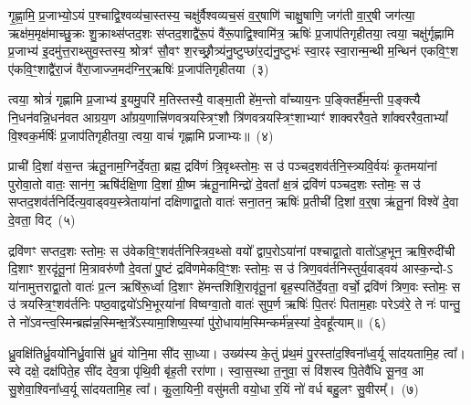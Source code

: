 गृ॒ह्णा॒मि॒ प्र॒जाभ्यो॒\-ऽयं प॒श्चाद्वि॒श्वव्य॑चा॒स्तस्य॒ चक्षु॑र्वैश्वव्यच॒सं व॒र्॒\mbox{}षाणि॑ चाक्षु॒षाणि॒ जग॑ती वा॒र्॒\mbox{}षी जग॑त्या॒ ऋक्ष॑म॒मृक्ष॑माच्छु॒क्रः शु॒क्राथ्स॑प्तद॒शः स॑प्तद॒शाद्वै॑रू॒पं वै॑रू॒पाद्वि॒श्वामि॑त्र॒ ऋषिः॑ प्र॒जा\-प॑तिगृहीतया॒ त्वया॒ चक्षु॑र्गृह्णामि प्र॒जाभ्य॑ इ॒दमु॑त्त॒राथ्सुव॒स्तस्य॒ श्रोत्रꣳ॑ सौ॒वꣳ श॒रच्छ्रौ॒त्र्य॑नु॒ष्टुप्छा॑र॒द्य॑नु॒ष्टुभः॑ स्वा॒रꣴ स्वा॒रान्म॒न्थी म॒न्थिन॑ एकवि॒ꣳ॒श ए॑कवि॒ꣳ॒शाद्वै॑रा॒जं वै॑रा॒जाज्ज॒मद॑ग्नि॒र्॒\mbox{}ऋषिः॑ प्र॒जा\-प॑तिगृहीतया~(३)

त्वया॒ श्रोत्रं॑ गृह्णामि प्र॒जाभ्य॑ इ॒यमु॒परि॑ म॒तिस्तस्यै॒ वाङ्मा॒ती हे॑म॒न्तो वा᳚च्याय॒नः प॒ङ्क्तिर्\mbox{}है॑म॒न्ती प॒ङ्क्त्यै नि॒धन॑वन्नि॒धन॑वत आग्रय॒ण आ᳚ग्रय॒णात्त्रि॑णवत्रयस्त्रिꣳ॒शौ त्रि॑णवत्रयस्त्रिꣳ॒शाभ्याꣳ॑ शाक्वररैव॒ते शा᳚क्वररैव॒ता\-भ्यां᳚ वि॒श्वक॒र्मर्\mbox{}षिः॑ प्र॒जा\-प॑तिगृहीतया॒ त्वया॒ वाचं॑ गृह्णामि प्रजाभ्यः॥~(४)

{\anuvakamend[{त्वया॒ मनो॑ ज॒मद॑ग्नि॒र्॒\mbox{}ऋषिः॑ प्र॒जा\-प॑तिगृहीतया त्रि॒ꣳ॒शच्च॑}]}%

प्राची॑ दि॒शां व॑स॒न्त ऋ॑तू॒नाम॒ग्निर्दे॒वता॒ ब्रह्म॒ द्रवि॑णं त्रि॒वृथ्स्तोमः॒ स उ॑ पञ्चद॒शव॑र्तनि॒स्त्र्यवि॒र्वयः॑ कृ॒तमया॑नां पुरोवा॒तो वातः॒ सान॑ग॒ ऋषि॑र्दक्षि॒णा दि॒शां ग्री॒ष्म ऋ॑तू॒नामिन्द्रो॑ दे॒वता᳚ क्ष॒त्रं द्रवि॑णं पञ्चद॒शः स्तोमः॒ स उ॑ सप्तद॒शव॑र्तनिर्दित्य॒वाड्वय॒स्त्रेताया॑नां दक्षिणाद्वा॒तो वातः॑ सना॒तन॒ ऋषिः॑ प्र॒तीची॑ दि॒शां व॒र्॒\mbox{}षा ऋ॑तू॒नां विश्वे॑ दे॒वा दे॒वता॒ विट्~(५)

द्रवि॑णꣳ सप्तद॒शः स्तोमः॒ स उ॑वेकवि॒ꣳ॒शव॑र्तनिस्त्रिव॒थ्सो वयो᳚ द्वाप॒रो\-ऽया॑नां पश्चाद्वा॒तो वातो॑\-ऽह॒भून॒ ऋषि॒रुदी॑ची दि॒शाꣳ श॒रदृ॑तू॒नां मि॒त्रावरु॑णौ दे॒वता॑ पु॒ष्टं द्रवि॑णमेकवि॒ꣳ॒शः स्तोमः॒ स उ॑ त्रिण॒वव॑र्तनिस्तुर्य॒वाड्वय॑ आस्क॒न्दो-\-ऽ या॑नामुत्तराद्वा॒तो वातः॑ प्र॒त्न ऋषि॑रू॒र्ध्वा दि॒शाꣳ हे॑मन्तशिशि॒रावृ॑तू॒नां बृह॒स्पति॑र्दे॒वता॒ वर्चो॒ द्रवि॑णं त्रिण॒वः स्तोमः॒ स उ॑ त्रयस्त्रि॒ꣳ॒शव॑र्तनिः पष्ठ॒वाद्वयो॑\-ऽभि॒भूरया॑नां विष्वग्वा॒तो वातः॑ सुप॒र्ण ऋषिः॑ पि॒तरः॑ पिताम॒हाः परे\-ऽव॑रे॒ ते नः॑ पान्तु॒ ते नो॑\-ऽवन्त्व॒स्मिन्ब्रह्म॑न्न॒स्मिन्क्ष॒त्रे᳚\-ऽस्यामा॒शिष्य॒स्यां पु॑रो॒धाया॑म॒स्मिन्कर्म॑न्न॒स्यां दे॒वहू᳚त्याम्॥~(६)

{\anuvakamend[{विट्प॑ष्ठ॒वाड्वयो॒\-ऽष्टाविꣳ॑शतिश्च}]}%

ध्रु॒वक्षि॑तिर्ध्रु॒वयो॑निर्ध्रु॒वासि॑ ध्रु॒वं योनि॒मा सी॑द सा॒ध्या। उख्य॑स्य के॒तुं प्र॑थ॒मं पु॒रस्ता॑द॒श्विना᳚ध्व॒र्यू सा॑दयतामि॒ह त्वा᳚। स्वे दक्षे॒ दक्ष॑पिते॒ह सी॑द देव॒त्रा पृ॑थि॒वी बृ॑ह॒ती ररा॑णा। स्वा॒स॒स्था त॒नुवा॒ सं वि॑शस्व पि॒तेवै॑धि सू॒नव॒ आ सु॒शेवा॒श्विना᳚ध्व॒र्यू सा॑दयतामि॒ह त्वा᳚। कु॒ला॒यिनी॒ वसु॑मती वयो॒धा र॒यिं नो॑ वर्ध बहु॒लꣳ सु॒वीरम्᳚।~(७)

